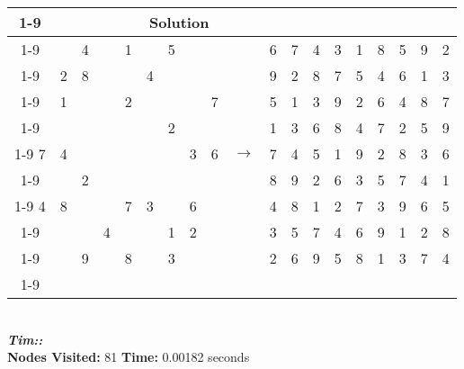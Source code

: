 \documentclass{article}
\begin{document}
\begin{tabular}{||c|c|c||c|c|c||c|c|c|| c ||c|c|c||c|c|c||c|c|c||}
  \cmidrule{1-9} \cmidrule{11-19}
  \multicolumn{9}{|c|}{Problem} &                   & \multicolumn{9}{|c|}{Solution}   \\\cmidrule{1-9} \cmidrule{11-19} \morecmidrules \cmidrule{1-9} \cmidrule{11-19}
  &   & 4 &   & 1 &   & 5 &   &   &  & 6 & 7 & 4 & 3 & 1 & 8 & 5 & 9 & 2\\\cmidrule{1-9} \cmidrule{11-19}
  & 2 & 8 &   &   & 4 &   &   &   &  & 9 & 2 & 8 & 7 & 5 & 4 & 6 & 1 & 3\\\cmidrule{1-9} \cmidrule{11-19}
  & 1 &   &   & 2 &   &   &   & 7 &  & 5 & 1 & 3 & 9 & 2 & 6 & 4 & 8 & 7\\\cmidrule{1-9} \cmidrule{11-19} \morecmidrules \cmidrule{1-9} \cmidrule{11-19}
  &   &   &   &   &   & 2 &   &   &  & 1 & 3 & 6 & 8 & 4 & 7 & 2 & 5 & 9\\\cmidrule{1-9} \cmidrule{11-19}
7 & 4 &   &   &   &   &   & 3 & 6 & $\rightarrow$ & 7 & 4 & 5 & 1 & 9 & 2 & 8 & 3 & 6\\\cmidrule{1-9} \cmidrule{11-19}
  &   & 2 &   &   &   &   &   &   &  & 8 & 9 & 2 & 6 & 3 & 5 & 7 & 4 & 1\\\cmidrule{1-9} \cmidrule{11-19} \morecmidrules \cmidrule{1-9} \cmidrule{11-19}
4 & 8 &   &   & 7 & 3 &   & 6 &   &  & 4 & 8 & 1 & 2 & 7 & 3 & 9 & 6 & 5\\\cmidrule{1-9} \cmidrule{11-19}
  &   &   & 4 &   &   & 1 & 2 &   &  & 3 & 5 & 7 & 4 & 6 & 9 & 1 & 2 & 8\\\cmidrule{1-9} \cmidrule{11-19}
  &   & 9 &   & 8 &   & 3 &   &   &  &  2 & 6 & 9 & 5 & 8 & 1 & 3 & 7 & 4\\\cmidrule{1-9} \cmidrule{11-19} \morecmidrules \cmidrule{1-9} \cmidrule{11-19}
\end{tabular}
\\
\small\emph{\textbf{Tim::}}\\ \textbf{Nodes Visited:} 81 \textbf{Time:} 0.00182 seconds\\
\end{document}
